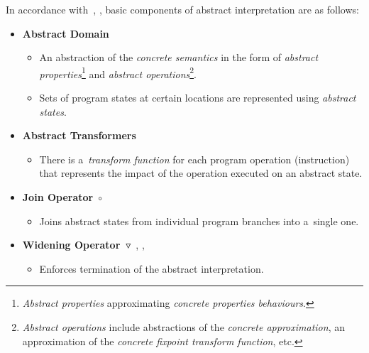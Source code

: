 In accordance with~\cite{favAI}, \cite{projectPracticeMarcin2018},
basic components of abstract interpretation are as follows:
\begin{itemize}
    \item \textbf{Abstract Domain}~\cite{AICousotWeb}
        \begin{itemize}
            \item
                An abstraction of the \emph{concrete semantics} in the form
                of \emph{abstract properties}\footnote{\emph{Abstract
                properties} approximating \emph{concrete properties
                behaviours}.} and \emph{abstract
                operations}\footnote{\emph{Abstract operations} include
                abstractions of the \emph{concrete approximation}, an
                approximation of the \emph{concrete fixpoint transform
                function}, etc.}.~\cite{AIBasedFormalMethodsCousot}

            \item
                Sets of program states at certain locations are represented
                using \emph{abstract states}.
        \end{itemize}

    \item \textbf{Abstract Transformers}
        \begin{itemize}
            \item
                There is a~\emph{transform function} for each program
                operation (instruction) that represents the impact
                of the operation executed on an abstract state.
        \end{itemize}

    \item \textbf{Join Operator}~$ \circ $
        \begin{itemize}
            \item
                Joins abstract states from individual program branches into
                a~single one.
        \end{itemize}

    \item
        \textbf{Widening
        Operator~$ \triangledown $}~\cite{programAnalysisNielson},
        \cite{wideningNarrowingCousot}, \cite{favAI}
        \begin{itemize}
            \item
                Enforces termination of the abstract interpretation.


\end{itemize}
\end{itemize}
